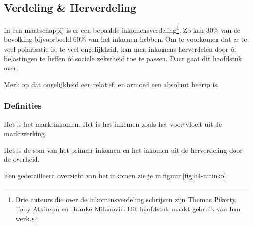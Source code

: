 \subsection{Verdeling \& Herverdeling}

In een maatschappij is er een bepaalde inkomensverdeling\footnote{Drie auteurs die over de inkomensverdeling schrijven zijn Thomas Piketty, Tony Atkinson en Branko Milanovic. Dit hoofdstuk maakt gebruik van hun werk.}. Zo kan 30\% van de bevolking bijvoorbeeld 60\% van het inkomen hebben. Om te voorkomen dat er te veel polarisatie is, te veel ongelijkheid, kan men inkomens herverdelen door \'of belastingen te heffen \'of sociale zekerheid toe te passen. Daar gaat dit hoofdstuk over.
\par Merk op dat ongelijkheid een relatief, en armoed een absoluut begrip is.

\subsubsection{Definities}

Het  is het marktinkomen. Het is het inkomen zoals het voortvloeit uit de marktwerking.
\par\noindent Het  is de som van het primair inkomen en het inkomen uit de herverdeling door de overheid.
\par Een gedetailleerd overzicht van het inkomen zie je in figuur \ref{fig:h4-uitinko}.

